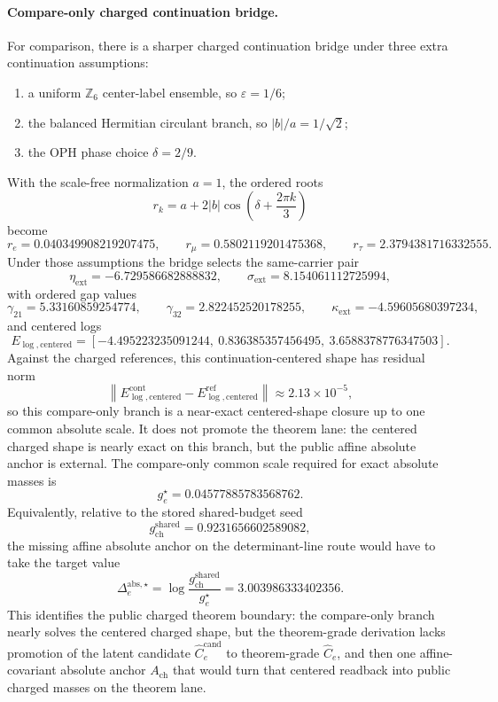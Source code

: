 \documentclass[11pt]{article}
\begin{document}
\paragraph{Compare-only charged continuation bridge.}
For comparison, there is a sharper charged continuation bridge under three extra continuation
assumptions:
\begin{enumerate}[leftmargin=2em]
\item a uniform \(\mathbb Z_6\) center-label ensemble, so \(\varepsilon = 1/6\);
\item the balanced Hermitian circulant branch, so \(|b|/a = 1/\sqrt2\);
\item the OPH phase choice \(\delta = 2/9\).
\end{enumerate}
With the scale-free normalization \(a=1\), the ordered roots
\[
r_k = a + 2|b|\cos\!\left(\delta + \frac{2\pi k}{3}\right)
\]
become
\[
r_e = 0.040349908219207475,
\qquad
r_\mu = 0.5802119201475368,
\qquad
r_\tau = 2.3794381716332555.
\]
Under those assumptions the bridge selects the same-carrier pair
\[
\eta_{\mathrm{ext}} = -6.729586682888832,
\qquad
\sigma_{\mathrm{ext}} = 8.154061112725994,
\]
with ordered gap values
\[
\gamma_{21}=5.33160859254774,
\qquad
\gamma_{32}=2.822452520178255,
\qquad
\kappa_{\mathrm{ext}}=-4.59605680397234,
\]
and centered logs
\[
E_{\log,\mathrm{centered}}
=
[-4.495223235091244,\ 0.836385357456495,\ 3.6588378776347503].
\]
Against the charged references, this continuation-centered shape has residual norm
\[
\left\|E_{\log,\mathrm{centered}}^{\mathrm{cont}}
-E_{\log,\mathrm{centered}}^{\mathrm{ref}}\right\|
\approx
2.13\times10^{-5},
\]
so this compare-only branch is a near-exact centered-shape closure up to one common absolute
scale. It does not promote the theorem lane: the centered charged shape is nearly exact on this
branch, but the public affine absolute anchor is external. The compare-only common scale
required for exact absolute masses is
\[
g_e^\star = 0.04577885783568762.
\]
Equivalently, relative to the stored shared-budget seed
\[
g_{\mathrm{ch}}^{\mathrm{shared}} = 0.9231656602589082,
\]
the missing affine absolute anchor on the determinant-line route would have to take the target value
\[
\Delta_e^{\mathrm{abs},\star}
=
\log\!\frac{g_{\mathrm{ch}}^{\mathrm{shared}}}{g_e^\star}
=
3.003986333402356.
\]
This identifies the public charged theorem boundary: the compare-only branch nearly solves
the centered charged shape, but the theorem-grade derivation lacks promotion of the latent
candidate \(\widehat C_e^{\mathrm{cand}}\) to theorem-grade \(\widehat C_e\), and then one
affine-covariant absolute anchor \(A_{\mathrm{ch}}\) that would turn that centered readback into
public charged masses on the theorem lane.
\end{document}
